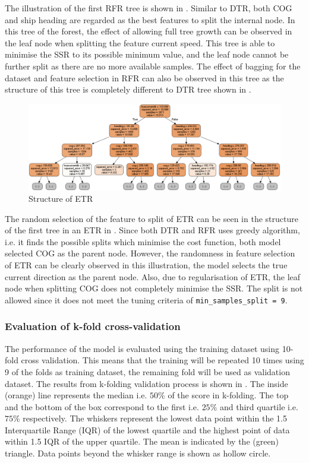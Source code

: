 The illustration of the first RFR tree is shown in . Similar to DTR, both COG and ship heading are regarded as the best features to split the internal node. In this tree of the forest, the effect of allowing full tree growth can be observed in the leaf node when splitting the feature current speed. This tree is able to minimise the SSR to its possible minimum value, and the leaf node cannot be further split as there are no more available samples. The effect of bagging for the dataset and feature selection in RFR can also be observed in this tree as the structure of this tree is completely different to DTR tree shown in .\\

\begin{figure}[h]
    \centering
        \includegraphics[width=.9\textwidth]{02_figures/etr_mod_it1.png}
        \caption{Structure of ETR}
        \label{fig:etr_tree1_etr}
\end{figure}
The random selection of the feature to split of ETR can be seen in the structure of the first tree in an ETR in . Since both DTR and RFR uses greedy algorithm, i.e. it finds the possible splits which minimise the cost function, both model selected COG as the parent node. However, the randomness in feature selection of ETR can be clearly observed in this illustration, the model selects the true current direction as the parent node. Also, due to regularisation of ETR, the leaf node when splitting COG does not completely minimise the SSR. The split is not allowed since it does not meet the tuning criteria of {\tt min\_samples\_split = 9}.\\ 

\subsubsection*{Evaluation of k-fold cross-validation}

The performance of the model is evaluated using the training dataset using 10-fold cross validation. This means that the training will be repeated 10 times using 9 of the folds as training dataset, the remaining fold will be used as validation dataset. The results from k-folding validation process is shown in . The inside (orange) line represents the median i.e. $50\%$ of the score in k-folding. The top and the bottom of the box correspond to the first i.e. $25\%$ and third quartile i.e. $75\%$ respectively. The whiskers represent the lowest data point within the 1.5 Interquartile Range (IQR) of the lowest quartile and the highest point of data within 1.5 IQR of the upper quartile. The mean is indicated by the (green) triangle. Data points beyond the whisker range is shown as hollow circle.\\


